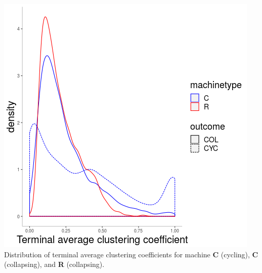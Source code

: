 \documentclass{tufte-handout}
\begin{document}
\begin{marginfigure}
  \vspace{-8cm}
  \includegraphics{outcomes-acc-dist.png} \\
  \caption{Distribution of terminal average clustering coefficients for machine \textbf{C} (cycling), \textbf{C} (collapsing), and \textbf{R} (collapsing).}\label{fig:OutcomesAccDist}
\end{marginfigure}
\end{document}
